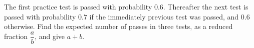 The first practice test is passed with probability $0.6$. Thereafter the next test is passed with probability $0.7$ if the immediately previous test was passed, and $0.6$ otherwise. Find the expected number of passes in three tests, as a reduced fraction $\dfrac{a}{b}$, and give $a+b$.
